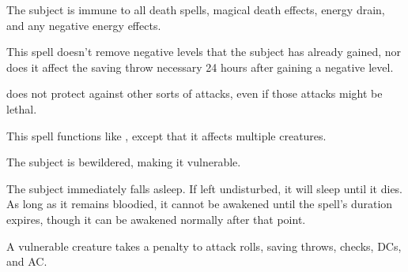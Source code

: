 \spellrng{\rngclose}
\spelldur{\durshort}
\begin{spelleffect}
  The subject is immune to all death spells, magical death effects, energy drain, and any negative energy effects.
\end{spelleffect}
\begin{spellnotes}
  This spell doesn't remove negative levels that the subject has already gained, nor does it affect the saving throw necessary 24 hours after gaining a negative level.
  \par {} does not protect against other sorts of attacks, even if those attacks might be lethal.
\end{spellnotes}

\spellrng{\rngmed}
\begin{spelleffect}
  This spell functions like , except that it affects multiple creatures.
\end{spelleffect}

\spellrng{\rngmed}
\spelldur{\durlong}
\begin{spellhealthy}
  The subject is bewildered, making it vulnerable.
\end{spellhealthy}
\begin{spellblood}
  The subject immediately falls asleep. If left undisturbed, it will sleep until it dies. As long as it remains bloodied, it cannot be awakened until the spell's duration expires, though it can be awakened normally after that point.
\end{spellblood}
\begin{spellnotes}
  A vulnerable creature takes a  penalty to attack rolls, saving throws, checks, DCs, and AC.
\end{spellnotes}

